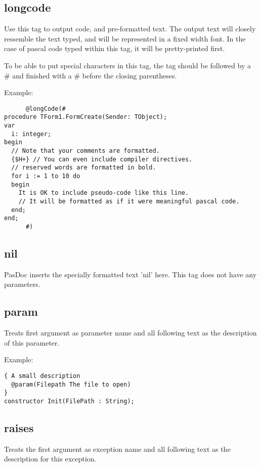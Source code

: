 \documentclass[11pt]{article}
\begin{document}
\subsection{longcode}

Use this tag to output code, and pre-formatted text. The output
text will closely ressemble the text typed, and will be represented
in a fixed width font. In the case of pascal code typed within this
tag, it will be pretty-printed first.

To be able to put special characters in this tag, the
tag should be followed by a \# and finished with a \# before
the closing parentheses.

Example:
\begin{verbatim}
      @longCode(#
procedure TForm1.FormCreate(Sender: TObject);
var
  i: integer;
begin
  // Note that your comments are formatted.
  {$H+} // You can even include compiler directives.
  // reserved words are formatted in bold.
  for i := 1 to 10 do
  begin
    It is OK to include pseudo-code like this line.
    // It will be formatted as if it were meaningful pascal code.
  end;
end;
      #)
\end{verbatim}      


\subsection{nil}

PasDoc inserts the specially formatted text 'nil' here. This tag does 
not have any parameters.

\subsection{param}

Treats first argument as parameter name and all following text as the 
description of this parameter. 

Example:
\begin{verbatim}
{ A small description 
  @param(Filepath The file to open)
}  
constructor Init(FilePath : String);
\end{verbatim}   


\subsection{raises} 

Treats the first argument as exception name and all following
text as the description for this exception. 
\end{document}
